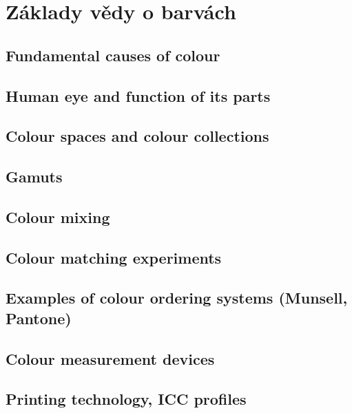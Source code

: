 \documentclass[../../main.tex]{subfiles}
\begin{document}
\section{Základy vědy o barvách}

\subsection{Fundamental causes of colour}
\subsection{Human eye and function of its parts}
\subsection{Colour spaces and colour collections}
\subsection{Gamuts}
\subsection{Colour mixing}
\subsection{Colour matching experiments}
\subsection{Examples of colour ordering systems (Munsell, Pantone)}
\subsection{Colour measurement devices}
\subsection{Printing technology, ICC profiles}
\end{document}
